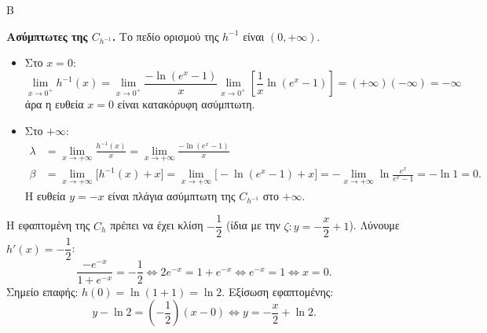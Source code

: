 \begin{thema}{Β}
\begin{erwthma}[resume]
\textbf{Ασύμπτωτες της $C_{h^{-1}}$.}
Το πεδίο ορισμού της $h^{-1}$ είναι $(0,+\infty)$.
\begin{itemize}
    \item Στο $x=0$:
\[\lim\limits_{x\to0^+}{h^{-1}(x)}=\lim\limits_{x\to0^+}{\frac{-\ln\left(e^x-1\right)}{x}}\lim\limits_{x\to0^+}{\left[\frac{1}{x}\ln{(e^x-1)}\right]}=(+\infty)(-\infty)=-\infty\]
 άρα η ευθεία $x=0$ είναι κατακόρυφη ασύμπτωτη.
    \item Στο $+\infty$:
    \begin{align*}
	\lambda&=\lim_{x\to+\infty}\frac{h^{-1}(x)}{x}=\lim_{x\to+\infty}\frac{-\ln(e^x-1)}{x}\\
    \beta&=\lim_{x\to+\infty}\bigl[h^{-1}(x)+x\bigr]=\lim_{x\to+\infty}\bigl[-\ln(e^x-1)+x\bigr]=-\lim_{x\to+\infty}\ln\frac{e^x}{e^x-1}=-\ln1=0.
	\end{align*}
    Η ευθεία $y=-x$ είναι πλάγια ασύμπτωτη της $C_{h^{-1}}$ στο $+\infty$.
\end{itemize}

\item Η εφαπτομένη της $C_h$ πρέπει να έχει κλίση $-\dfrac{1}{2}$ (ίδια με την $\zeta: y=-\dfrac{x}{2}+1$).
Λύνουμε $h'(x)=-\dfrac{1}{2}$:
\[
\frac{-e^{-x}}{1+e^{-x}}=-\frac{1}{2}\Leftrightarrow 2e^{-x}=1+e^{-x}\Leftrightarrow e^{-x}=1\Leftrightarrow x=0.
\]
Σημείο επαφής: $h(0)=\ln\!\left(1+1\right)=\ln 2$.
Εξίσωση εφαπτομένης:
\[
y-\ln2=\left(-\frac{1}{2}\right)(x-0)\Leftrightarrow y=-\frac{x}{2}+\ln2.
\]

\end{erwthma}
\end{thema}

